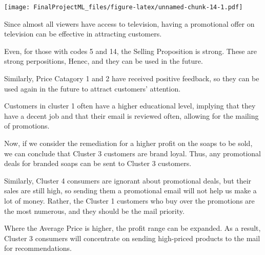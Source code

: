 \documentclass[
]{article}
\begin{document}
\texttt{[image: FinalProjectML\_files/figure-latex/unnamed-chunk-14-1.pdf]}

Since almost all viewers have access to television, having a promotional
offer on television can be effective in attracting customers.

Even, for those with codes 5 and 14, the Selling Proposition is strong.
These are strong perpositions, Henec, and they can be used in the
future.

Similarly, Price Catagory 1 and 2 have received positive feedback, so
they can be used again in the future to attract customers' attention.

Customers in cluster 1 often have a higher educational level, implying
that they have a decent job and that their email is reviewed often,
allowing for the mailing of promotions.

Now, if we consider the remediation for a higher profit on the soaps to
be sold, we can conclude that Cluster 3 customers are brand loyal. Thus,
any promotional deals for branded soaps can be sent to Cluster 3
customers.

Similarly, Cluster 4 consumers are ignorant about promotional deals, but
their sales are still high, so sending them a promotional email will not
help us make a lot of money. Rather, the Cluster 1 customers who buy
over the promotions are the most numerous, and they should be the mail
priority.

Where the Average Price is higher, the profit range can be expanded. As
a result, Cluster 3 consumers will concentrate on sending high-priced
products to the mail for recommendations.
\end{document}
